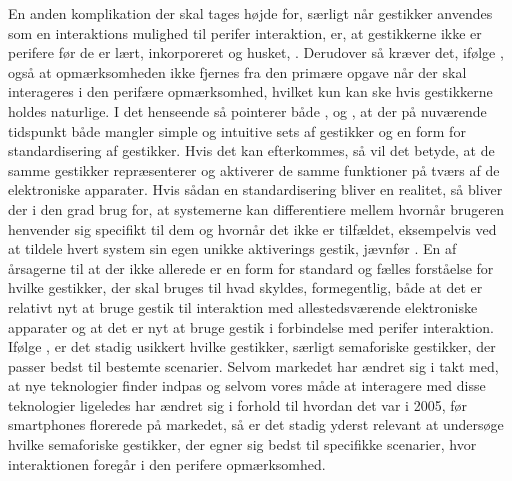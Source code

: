 En anden komplikation der skal tages højde for, særligt når gestikker anvendes som en interaktions mulighed til perifer interaktion, er, at gestikkerne ikke er perifere før de er lært, inkorporeret og husket, \parencite[s. 16]{PDF:PIEmbeddingHCIOnTheRelevance}. Derudover så kræver det, ifølge \textcite[s. 16]{PDF:PIEmbeddingHCIOnTheRelevance}, også at opmærksomheden ikke fjernes fra den primære opgave når der skal interageres i den perifære opmærksomhed, hvilket kun kan ske hvis gestikkerne holdes naturlige. I det henseende så pointerer både \textcite[s. 8]{PDF:NaturalUserInterfaces}, \textcite[s. 26]{PDF:ATaxonomyOfGestures} og \textcite[s. 19]{PDF:PIEmbeddingHCIOnTheRelevance}, at der på nuværende tidspunkt både mangler simple og intuitive sets af gestikker og en form for standardisering af gestikker. Hvis det kan efterkommes, så vil det betyde, at de samme gestikker repræsenterer og aktiverer de samme funktioner på tværs af de elektroniske apparater. Hvis sådan en standardisering bliver en realitet, så bliver der i den grad brug for, at systemerne kan differentiere mellem hvornår brugeren henvender sig specifikt til dem og hvornår det ikke er tilfældet, eksempelvis ved at tildele hvert system sin egen unikke aktiverings gestik, jævnfør . En af årsagerne til at der ikke allerede er en form for standard og fælles forståelse for hvilke gestikker, der skal bruges til hvad skyldes, formegentlig, både at det er relativt nyt at bruge gestik til interaktion med allestedsværende elektroniske apparater og at det er nyt at bruge gestik i forbindelse med perifer interaktion. Ifølge \textcite[s. 28]{PDF:ATaxonomyOfGestures}, er det stadig usikkert hvilke gestikker, særligt semaforiske gestikker, der passer bedst til bestemte scenarier. Selvom markedet har ændret sig i takt med, at nye teknologier finder indpas og selvom vores måde at interagere med disse teknologier ligeledes har ændret sig i forhold til hvordan det var i 2005, før smartphones florerede på markedet, så er det stadig yderst relevant at undersøge hvilke semaforiske gestikker, der egner sig bedst til specifikke scenarier, hvor interaktionen foregår i den perifere opmærksomhed.

